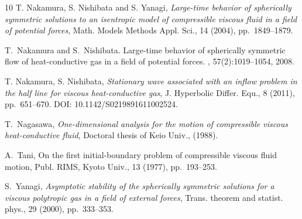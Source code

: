 \documentclass[a4paper,12pt,draft]{article}
\theoremstyle{remark}
\begin{document}
\begin{thebibliography}{10}
{\sc T. Nakamura, S. Nishibata and S. Yanagi}, {\em Large-time behavior of spherically symmetric solutions to an isentropic model of compressible viscous fluid in a field of potential forces}, Math. Models Methods Appl. Sci., 14 (2004), pp.~1849--1879. 

T.~Nakamura and S.~Nishibata.
\newblock Large-time behavior of spherically symmetric flow of heat-conductive
gas in a field of potential forces.
, 57(2):1019--1054, 2008.


{\sc T. Nakamura, S. Nishibata},
{\em Stationary wave associated with an inflow problem in the half line for 
viscous heat-conductive gas},
J. Hyperbolic Differ. Equ., 8
(2011), pp.~651--670. DOI: 10.1142/S0219891611002524.


  
{\sc T.~Nagasawa}, {\em One-dimensional analysis for the motion of compressible
  viscous heat-conductive fluid}, Doctoral thesis of Keio Univ.,  (1988).




{\sc A.~Tani},
On the first initial-boundary problem of compressible
viscous fluid motion,
Publ. RIMS, Kyoto Univ.,
13 (1977), pp.~193--253.

{\sc S.~Yanagi}, {\em Asymptotic stability
  of the spherically symmetric solutions for a viscous polytropic gas in a
  field of external forces}, Trans. theorem and statist. phys., 29 (2000),
  pp.~333--353.

\end{thebibliography}
\end{document}
